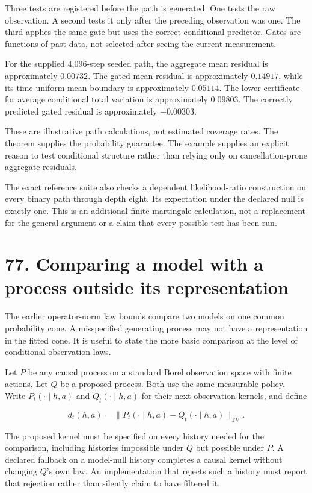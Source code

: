 \documentclass[11pt,letterpaper]{article}
\begin{document}
Three tests are registered before the path is generated. One tests the
raw observation. A second tests it only after the preceding observation
was one. The third applies the same gate but uses the correct
conditional predictor. Gates are functions of past data, not selected
after seeing the current measurement.

For the supplied 4,096-step seeded path, the aggregate mean residual is
approximately \(0.00732\). The gated mean residual is approximately
\(0.14917\), while its time-uniform mean boundary is approximately
\(0.05114\). The lower certificate for average conditional total
variation is approximately \(0.09803\). The correctly predicted gated
residual is approximately \(-0.00303\).

These are illustrative path calculations, not estimated coverage rates.
The theorem supplies the probability guarantee. The example supplies an
explicit reason to test conditional structure rather than relying only
on cancellation-prone aggregate residuals.

The exact reference suite also checks a dependent likelihood-ratio
construction on every binary path through depth eight. Its expectation
under the declared null is exactly one. This is an additional finite
martingale calculation, not a replacement for the general argument or a
claim that every possible test has been run.

\section{77. Comparing a model with a process outside its
representation}\label{comparing-a-model-with-a-process-outside-its-representation}

The earlier operator-norm law bounds compare two models on one common
probability cone. A misspecified generating process may not have a
representation in the fitted cone. It is useful to state the more basic
comparison at the level of conditional observation laws.

Let \(P\) be any causal process on a standard Borel observation space
with finite actions. Let \(Q\) be a proposed process. Both use the same
measurable policy. Write \(P_t(\cdot\mid h,a)\) and
\(Q_t(\cdot\mid h,a)\) for their next-observation kernels, and define

\[
d_t(h,a)=\|P_t(\cdot\mid h,a)-Q_t(\cdot\mid h,a)\|_{\mathrm{TV}}.
\]

The proposed kernel must be specified on every history needed for the
comparison, including histories impossible under \(Q\) but possible
under \(P\). A declared fallback on a model-null history completes a
causal kernel without changing \(Q\)'s own law. An implementation that
rejects such a history must report that rejection rather than silently
claim to have filtered it.
\end{document}
